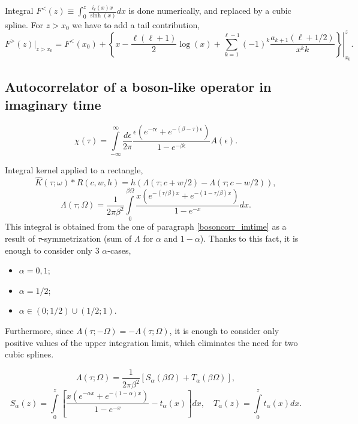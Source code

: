 \documentclass[]{article}
\begin{document}
Integral $F^<(z) \equiv \int_0^z \frac{i_\ell(x)x}{\sinh(x)} dx$ is done numerically,
and replaced by a cubic spline. For $z>x_0$ we have to add a tail contribution,
\begin{equation}
F^>(z)|_{z>x_0} = F^<(x_0) +
\left.\left\{
x - \frac{\ell(\ell+1)}{2}\log(x) +
\sum_{k=1}^{\ell-1} (-1)^k\frac{a_{k+1}(\ell+1/2)}{x^k k}
\right\}\right|_{x_0}^z.
\end{equation}

\subsection{Autocorrelator of a boson-like operator in imaginary time}
\label{bosonautocorr_imtime}
\begin{equation}
\chi(\tau) = \int\limits_{-\infty}^\infty \frac{d\epsilon}{2\pi}
\frac{\epsilon (e^{-\tau\epsilon}+e^{-(\beta-\tau)\epsilon})}
{1-e^{-\beta\epsilon}} A(\epsilon).
\end{equation}

Integral kernel applied to a rectangle,
\begin{equation}
\hat K(\tau;\omega)*R(c,w,h) =
h(\Lambda(\tau;c+w/2) - \Lambda(\tau;c-w/2)),
\end{equation}
\begin{equation}
\Lambda(\tau;\Omega) = \frac{1}{2\pi\beta^2}
\int\limits_0^{\beta\Omega}\frac{x(e^{-(\tau/\beta)x}+e^{-(1-\tau/\beta)x})}
{1-e^{-x}}dx.
\end{equation}
This integral is obtained from the one of paragraph \ref{bosoncorr_imtime}
as a result of $\tau$-symmetrization (sum of $\Lambda$ for $\alpha$ and $1-\alpha$).
Thanks to this fact, it is enough to consider only 3 $\alpha$-cases,
\begin{itemize}
	\item $\alpha=0,1$;
	\item $\alpha=1/2$;
	\item $\alpha\in(0;1/2)\cup(1/2;1)$.
\end{itemize}
Furthermore, since $\Lambda(\tau;-\Omega) = -\Lambda(\tau;\Omega)$, it is enough to consider only positive  values of the upper integration limit, which eliminates the need for two cubic splines.

\begin{equation}
\Lambda(\tau;\Omega) = \frac{1}{2\pi\beta^2} \left[
S_\alpha(\beta\Omega) + T_\alpha(\beta\Omega) \right],
\end{equation}
\begin{equation}
S_\alpha(z) = \int\limits_0^z
\left[\frac{x(e^{-\alpha x}+e^{-(1-\alpha)x})}{1-e^{-x}} - t_\alpha(x)
\right] dx, \quad
T_\alpha(z) = \int\limits_0^z t_\alpha(x) dx.
\end{equation}
\end{document}
